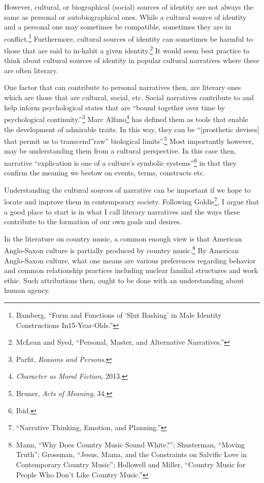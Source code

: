 \documentclass[phdthesis,12pt,final,a4paper]{wuthesis}
\theoremstyle{definition}
\theoremstyle{definition}
\theoremstyle{definition}
\theoremstyle{definition}
\theoremstyle{remark}
\begin{document}
However, cultural, or biographical (social) sources of identity are not always the same as personal or autobiographical ones. While a cultural source of identity and a personal one may sometimes be compatible, sometimes they are in conflict.\footnote{Bamberg, {``Form and {Functions} of {`{Slut Bashing}'} in {Male Identity Constructions} In15-{Year-Olds}.''}} Furthermore, cultural sources of identity can sometimes be harmful to those that are said to in-habit a given identity.\footnote{McLean and Syed, {``Personal, {Master}, and {Alternative Narratives}.''}} It would seem best practice to think about cultural sources of identity in popular cultural narratives where these are often literary.

One factor that can contribute to personal narratives then, are literary ones which are those that are cultural, social, etc. Social narratives contribute to and help inform psychological states that are ``bound together over time by psychological continuity.''\footnote{Parfit, \emph{Reasons and Persons}.} Marc Alfano\footnote{\emph{Character as Moral Fiction}, 2013.} has defined them as tools that enable the development of admirable traits. In this way, they can be ``{[}prosthetic devises{]} that permit us to transcend''raw'' biological limits''.\footnote{Bruner, \emph{Acts of Meaning}, 34.} Most importantly however, may be understanding them from a cultural perspective. In this case then, narrative ``explication is one of a culture's symbolic systems''\footnote{Ibid.} in that they confirm the meaning we bestow on events, terms, constructs etc.

Understanding the cultural sources of narrative can be important if we hope to locate and improve them in contemporary society. Following Goldie\footnote{{``Narrative {Thinking}, {Emotion}, and {Planning}.''}}, I argue that a good place to start is in what I call literary narratives and the ways these contribute to the formation of our own goals and desires.

In the literature on country music, a common enough view is that American Anglo-Saxon culture is partially produced by country music.\footnote{Mann, {``Why Does Country Music Sound White?''}; Shusterman, {``Moving {Truth}''}; Grossman, {``Jesus, {Mama}, and the {Constraints} on {Salvific Love} in {Contemporary Country Music}''}; Hollowell and Miller, {``Country {Music} for {People Who Don}'t {Like Country Music}.''}} By American Anglo-Saxon culture, what one means are various preferences regarding behavior and common relationship practices including nuclear familial structures and work ethic. Such attributions then, ought to be done with an understanding about human agency.
\end{document}
